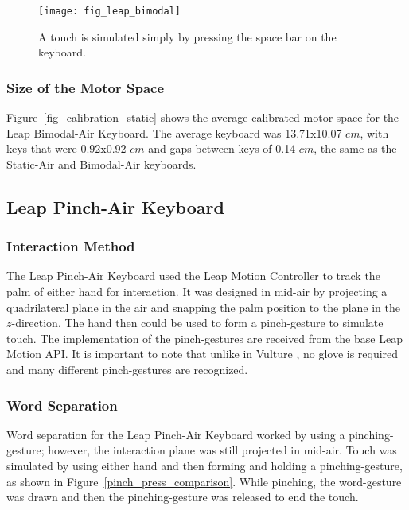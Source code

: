 \begin{figure}[h]
	\centering
	\texttt{[image: fig\_leap\_bimodal]}
	\caption[Leap Bimodal-Air Word-Separation]{A touch is simulated simply by pressing the space bar on the keyboard.}
	\label{bimodal_press}
\end{figure}

\subsubsection{Size of the Motor Space}
Figure~\ref{fig_calibration_static} shows the average calibrated motor space for the Leap Bimodal-Air Keyboard. The average keyboard was 13.71x10.07 $cm$, with keys that were 0.92x0.92 $cm$ and gaps between keys of 0.14 $cm$, the same as the Static-Air and Bimodal-Air keyboards.

\subsection{Leap Pinch-Air Keyboard}
\subsubsection{Interaction Method}
The Leap Pinch-Air Keyboard used the Leap Motion Controller to track the palm of either hand for interaction. It was designed in mid-air by projecting a quadrilateral plane in the air and snapping the palm position to the plane in the $z$-direction. The hand then could be used to form a pinch-gesture to simulate touch. The implementation of the pinch-gestures are received from the base Leap Motion API. It is important to note that unlike in Vulture \cite{ref_vulture}, no glove is required and many different pinch-gestures are recognized.

\subsubsection{Word Separation}
Word separation for the Leap Pinch-Air Keyboard worked by using a pinching-gesture; however, the interaction plane was still projected in mid-air. Touch was simulated by using either hand and then forming and holding a pinching-gesture, as shown in Figure~\ref{pinch_press_comparison}. While pinching, the word-gesture was drawn and then the pinching-gesture was released to end the touch.


